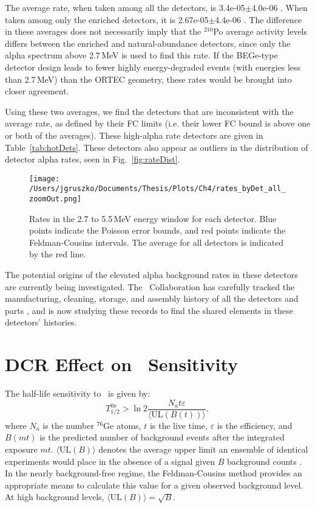 The average rate, when taken among all the detectors, is 3.4e-05$\pm$4.0e-06 \cpKkgd . When taken among only the enriched detectors, it is 2.67e-05$\pm$4.4e-06  \cpKkgd. The difference in these averages does not necessarily imply that the $^{210}$Po average activity levels differs between the enriched and natural-abundance detectors, since only the alpha spectrum above 2.7\,MeV is used to find this rate. If the BEGe-type detector design leads to fewer highly energy-degraded events (with energies less than 2.7\,MeV) than the ORTEC geometry, these rates would be brought into closer agreement. 

Using these two averages, we find the detectors that are inconsistent with the average rate, as defined by their FC limits (i.e. their lower FC bound is above one or both of the averages). These high-alpha rate detectors are given in Table~\ref{tab:hotDets}. These detectors also appear as outliers in the distribution of detector alpha rates, seen in Fig.~\ref{fig:rateDist}. 

\begin{sidewaysfigure}[]
  \centering
 \texttt{[image: /Users/jgruszko/Documents/Thesis/Plots/Ch4/rates\_byDet\_all\_zoomOut.png]}
\caption[Alpha background rates in all detectors]{Rates in the 2.7 to 5.5\,MeV energy window for each detector. Blue points indicate the Poisson error bounds, and red points indicate the Feldman-Cousins intervals. The average for all detectors is indicated by the red line.}
\label{fig:rates_byDet}
\end{sidewaysfigure}

The potential origins of the elevated alpha background rates in these detectors are currently being investigated. The \MJ\ Collaboration has carefully tracked the manufacturing, cleaning, storage, and assembly history of all the detectors and parts \cite{PTDB}, and is now studying these records to find the shared elements in these detectors' histories. 

\section{DCR Effect on \nonubb\ Sensitivity}
The half-life sensitivity to \nonubb\ is given by:
$$ T^{0\nu}_{1/2} > \ln 2 \frac{N_a t \varepsilon }{\langle \mathrm{UL}(B(t))\rangle}, $$
where $N_a$  is the number $^{76}$Ge atoms, $t$ is the live time, $\varepsilon$ is the efficiency, and $B(mt)$ is the predicted number of background events after the integrated exposure $mt$. $\langle$UL$(B)\rangle$ denotes the average upper limit an ensemble of identical experiments would place in the absence of a signal given $B$ background counts \cite{Detwiler_sensitivity}. In the nearly background-free regime, the Feldman-Cousins method \cite{FeldmanCousins} provides an appropriate means to calculate this value for a given observed background level. At high background levels, $\langle$UL$(B)\rangle = \sqrt B$. 

